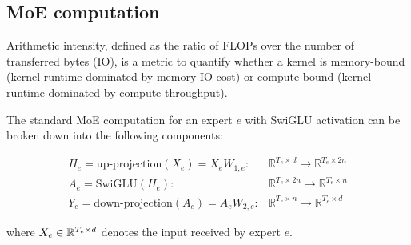 \subsection{MoE computation}\label{sec:background:arithmetic}


Arithmetic intensity, defined as the ratio of FLOPs over the number of transferred bytes (IO), is a metric to quantify whether a kernel is memory-bound (kernel runtime dominated by memory IO cost) or compute-bound (kernel runtime dominated by compute throughput).%

The standard MoE computation for an expert $e$ with SwiGLU activation can be broken down into the following components:

\vspace{-3em}
\begin{align}
    H_e = \text{up-projection}(X_e) = X_e W_{1,e}:& \mathbb{R}^{T_e \times d} \to \mathbb{R}^{T_e \times 2n}\\
    A_e = \text{SwiGLU}(H_e):& \mathbb{R}^{T_e \times 2n} \to \mathbb{R}^{T_e \times n}\\
    Y_e = \text{down-projection}(A_e) = A_e W_{2,e}:& \mathbb{R}^{T_e \times n} \to \mathbb{R}^{T_e \times d}
\end{align}
\vspace{-2em}

where $X_e \in \mathbb{R}^{T_e\times d}$ denotes the input received by expert $e$.




